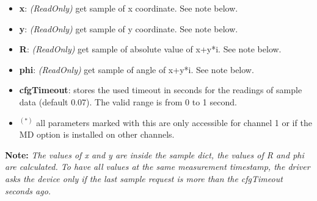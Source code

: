 \documentclass[11pt]{article} %
\begin{document}
\begin{itemize}
\begin{longtable}{p{1.5cm}p{4cm}p{11cm}}
	\end{longtable}
	\item {\bf x}: {\it (ReadOnly)} get sample of x coordinate. See note below.
	\item {\bf y}: {\it (ReadOnly)} get sample of y coordinate. See note below.
	\item {\bf R}: {\it (ReadOnly)} get sample of absolute value of x+y*i. See note below.
	\item {\bf phi}: {\it (ReadOnly)} get sample of angle of x+y*i. See note below.
	\item {\bf cfgTimeout}: stores the  used timeout in seconds for the readings of sample data (default 0.07). The valid range is from 0 to 1 second.
	\item $^{(*)}$ all parameters marked with this are only accessible for channel 1 or if the MD option is installed on other channels.
	\end{itemize}
	{\bf Note:} {\it The values of x and y are inside the sample dict, the values of R and phi are calculated. To have all values at the same measurement timestamp, the driver asks the device only if the last sample request is more than the cfgTimeout seconds ago.}
\end{document}
